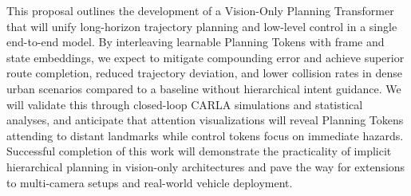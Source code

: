\documentclass[11pt,a4paper]{article}
\begin{document}
This proposal outlines the development of a Vision-Only Planning Transformer that will unify long-horizon trajectory planning and low-level control in a single end-to-end model. By interleaving learnable Planning Tokens with frame and state embeddings, we expect to mitigate compounding error and achieve superior route completion, reduced trajectory deviation, and lower collision rates in dense urban scenarios compared to a baseline without hierarchical intent guidance. We will validate this through closed-loop CARLA simulations and statistical analyses, and anticipate that attention visualizations will reveal Planning Tokens attending to distant landmarks while control tokens focus on immediate hazards. Successful completion of this work will demonstrate the practicality of implicit hierarchical planning in vision-only architectures and pave the way for extensions to multi-camera setups and real-world vehicle deployment.



\end{document}
